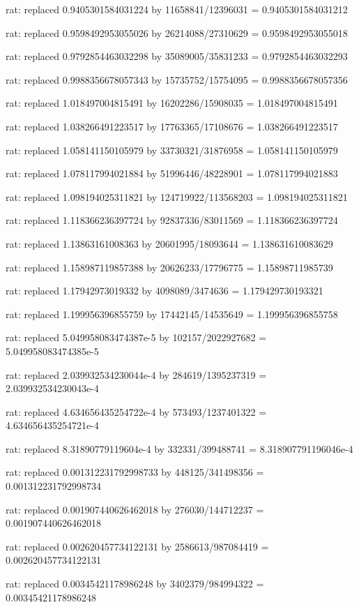 \documentclass[a4paper,10pt]{article}
\begin{document}
\begin{eulernotebook}
\begin{eulercomment}
\begin{eulercomment}
\begin{eulercomment}
\begin{eulercomment}
\begin{eulercomment}
\begin{eulercomment}
\begin{eulercomment}
\begin{eulercomment}
\begin{eulercomment}
\begin{eulercomment}
\begin{eulercomment}
\begin{eulercomment}
\begin{eulercomment}
\begin{eulercomment}
\begin{eulercomment}
\begin{eulercomment}
\begin{euleroutput}
  rat: replaced 0.9405301584031224 by 11658841/12396031 = 0.9405301584031212
  
  rat: replaced 0.9598492953055026 by 26214088/27310629 = 0.9598492953055018
  
  rat: replaced 0.9792854463032298 by 35089005/35831233 = 0.9792854463032293
  
  rat: replaced 0.9988356678057343 by 15735752/15754095 = 0.9988356678057356
  
  rat: replaced 1.018497004815491 by 16202286/15908035 = 1.018497004815491
  
  rat: replaced 1.038266491223517 by 17763365/17108676 = 1.038266491223517
  
  rat: replaced 1.058141150105979 by 33730321/31876958 = 1.058141150105979
  
  rat: replaced 1.078117994021884 by 51996446/48228901 = 1.078117994021883
  
  rat: replaced 1.098194025311821 by 124719922/113568203 = 1.098194025311821
  
  rat: replaced 1.118366236397724 by 92837336/83011569 = 1.118366236397724
  
  rat: replaced 1.13863161008363 by 20601995/18093644 = 1.138631610083629
  
  rat: replaced 1.158987119857388 by 20626233/17796775 = 1.15898711985739
  
  rat: replaced 1.17942973019332 by 4098089/3474636 = 1.179429730193321
  
  rat: replaced 1.199956396855759 by 17442145/14535649 = 1.199956396855758
  
  rat: replaced 5.049958083474387e-5 by 102157/2022927682 = 5.049958083474385e-5
  
  rat: replaced 2.039932534230044e-4 by 284619/1395237319 = 2.039932534230043e-4
  
  rat: replaced 4.634656435254722e-4 by 573493/1237401322 = 4.634656435254721e-4
  
  rat: replaced 8.31890779119604e-4 by 332331/399488741 = 8.318907791196046e-4
  
  rat: replaced 0.001312231792998733 by 448125/341498356 = 0.001312231792998734
  
  rat: replaced 0.001907440626462018 by 276030/144712237 = 0.001907440626462018
  
  rat: replaced 0.002620457734122131 by 2586613/987084419 = 0.002620457734122131
  
  rat: replaced 0.00345421178986248 by 3402379/984994322 = 0.00345421178986248
  

\end{euleroutput}
\end{eulercomment}
\end{eulercomment}
\end{eulercomment}
\end{eulercomment}
\end{eulercomment}
\end{eulercomment}
\end{eulercomment}
\end{eulercomment}
\end{eulercomment}
\end{eulercomment}
\end{eulercomment}
\end{eulercomment}
\end{eulercomment}
\end{eulercomment}
\end{eulercomment}
\end{eulercomment}
\end{eulernotebook}
\end{document}
